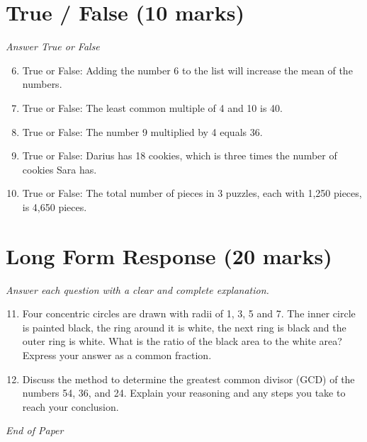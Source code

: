 \documentclass[12pt]{article}
\begin{document}
\section*{True / False (10 marks)}
\textit{Answer True or False}
\begin{enumerate}[label=\arabic*.]
\setcounter{enumi}{5}
\item True or False: Adding the number 6 to the list will increase the mean of the numbers.
\item True or False: The least common multiple of 4 and 10 is 40.
\item True or False: The number 9 multiplied by 4 equals 36.
\item True or False: Darius has 18 cookies, which is three times the number of cookies Sara has.
\item True or False: The total number of pieces in 3 puzzles, each with 1,250 pieces, is 4,650 pieces.
\end{enumerate}

\section*{Long Form Response (20 marks)}
\textit{Answer each question with a clear and complete explanation.}
\begin{enumerate}[label=\arabic*.]
\setcounter{enumi}{10}
\item Four concentric circles are drawn with radii of 1, 3, 5 and 7. The inner circle is painted black, the ring around it is white, the next ring is black and the outer ring is white. What is the ratio of the black area to the white area? Express your answer as a common fraction.
\item Discuss the method to determine the greatest common divisor (GCD) of the numbers 54, 36, and 24. Explain your reasoning and any steps you take to reach your conclusion.
\end{enumerate}

\vfill
\noindent\textit{End of Paper}
\end{document}
